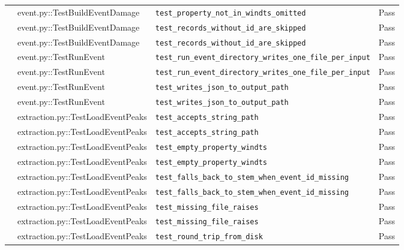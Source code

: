 \documentclass[11pt,a4paper]{article}
\begin{document}
\begin{center}
\begin{longtable}{p{2.2cm} p{4.5cm} p{6.5cm} p{1.4cm}}
     & event.py::TestBuildEventDamage & \texttt{test\_property\_not\_in\_windts\_omitted} & \textcolor{green!60!black}{Pass} \\
     & event.py::TestBuildEventDamage & \texttt{test\_records\_without\_id\_are\_skipped} & \textcolor{green!60!black}{Pass} \\
     & event.py::TestBuildEventDamage & \texttt{test\_records\_without\_id\_are\_skipped} & \textcolor{green!60!black}{Pass} \\
     & event.py::TestRunEvent & \texttt{test\_run\_event\_directory\_writes\_one\_file\_per\_input} & \textcolor{green!60!black}{Pass} \\
     & event.py::TestRunEvent & \texttt{test\_run\_event\_directory\_writes\_one\_file\_per\_input} & \textcolor{green!60!black}{Pass} \\
     & event.py::TestRunEvent & \texttt{test\_writes\_json\_to\_output\_path} & \textcolor{green!60!black}{Pass} \\
     & event.py::TestRunEvent & \texttt{test\_writes\_json\_to\_output\_path} & \textcolor{green!60!black}{Pass} \\
     & extraction.py::TestLoadEventPeaks & \texttt{test\_accepts\_string\_path} & \textcolor{green!60!black}{Pass} \\
     & extraction.py::TestLoadEventPeaks & \texttt{test\_accepts\_string\_path} & \textcolor{green!60!black}{Pass} \\
     & extraction.py::TestLoadEventPeaks & \texttt{test\_empty\_property\_windts} & \textcolor{green!60!black}{Pass} \\
     & extraction.py::TestLoadEventPeaks & \texttt{test\_empty\_property\_windts} & \textcolor{green!60!black}{Pass} \\
     & extraction.py::TestLoadEventPeaks & \texttt{test\_falls\_back\_to\_stem\_when\_event\_id\_missing} & \textcolor{green!60!black}{Pass} \\
     & extraction.py::TestLoadEventPeaks & \texttt{test\_falls\_back\_to\_stem\_when\_event\_id\_missing} & \textcolor{green!60!black}{Pass} \\
     & extraction.py::TestLoadEventPeaks & \texttt{test\_missing\_file\_raises} & \textcolor{green!60!black}{Pass} \\
     & extraction.py::TestLoadEventPeaks & \texttt{test\_missing\_file\_raises} & \textcolor{green!60!black}{Pass} \\
     & extraction.py::TestLoadEventPeaks & \texttt{test\_round\_trip\_from\_disk} & \textcolor{green!60!black}{Pass} \\

\end{longtable}
\end{center}
\end{document}
